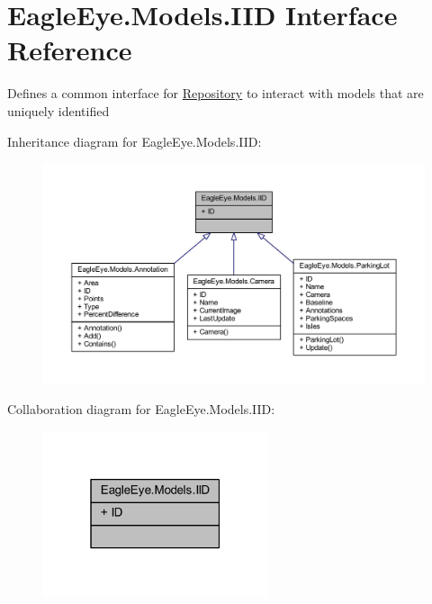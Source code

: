 \hypertarget{interface_eagle_eye_1_1_models_1_1_i_i_d}{}\section{Eagle\+Eye.\+Models.\+I\+ID Interface Reference}
\label{interface_eagle_eye_1_1_models_1_1_i_i_d}


Defines a common interface for \mbox{\hyperlink{class_eagle_eye_1_1_models_1_1_repository}{Repository}} to interact with models that are uniquely identified  




Inheritance diagram for Eagle\+Eye.\+Models.\+I\+ID\+:\nopagebreak
\begin{figure}[H]
\begin{center}
\leavevmode
\includegraphics[width=350pt]{interface_eagle_eye_1_1_models_1_1_i_i_d__inherit__graph}
\end{center}
\end{figure}


Collaboration diagram for Eagle\+Eye.\+Models.\+I\+ID\+:\nopagebreak
\begin{figure}[H]
\begin{center}
\leavevmode
\includegraphics[width=187pt]{interface_eagle_eye_1_1_models_1_1_i_i_d__coll__graph}
\end{center}
\end{figure}
